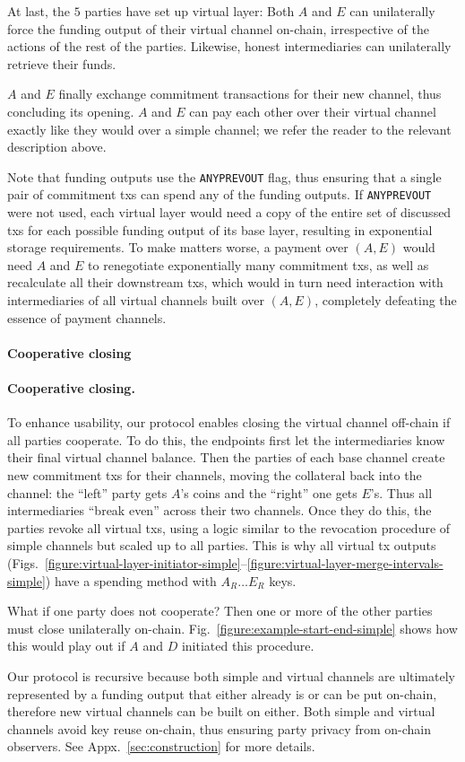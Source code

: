  At last, the $5$ parties have set up virtual layer: Both $A$ and $E$ can
  unilaterally
  force the funding output of their virtual channel on-chain, irrespective of
  the actions of the rest of the parties. Likewise, honest intermediaries can
  unilaterally retrieve their funds.

  $A$ and $E$ finally exchange
  commitment transactions for their new channel, thus concluding its opening.
  $A$ and $E$ can pay each other over their virtual channel exactly like
  they would over a simple channel; we refer the reader to the relevant
  description above.

  Note that funding outputs use the \texttt{ANYPREVOUT} flag, thus ensuring
  that a single pair of commitment txs can spend any of the funding outputs. If
  \texttt{ANYPREVOUT} were not used, each virtual layer would need a copy of the
  entire set of discussed txs for each possible funding output of its base
  layer, resulting in exponential storage requirements. To make matters worse,
  a payment over $(A, E)$ would need $A$ and $E$ to renegotiate exponentially
  many commitment txs, as well as recalculate all their downstream txs, which
  would in turn need interaction with intermediaries of all virtual channels
  built over $(A, E)$, completely defeating the essence of payment channels.

  \makeatletter%
    {\paragraph{Cooperative closing}}%
    {\paragraph{Cooperative closing.}}%
  \makeatother%
  To enhance usability, our protocol enables closing the virtual channel
  off-chain if all parties cooperate. To do this, the endpoints first
  let the intermediaries know their final virtual channel balance. Then the
  parties of each base channel create new commitment txs for their channels,
  moving the collateral back into the channel: the ``left'' party gets $A$'s
  coins and the ``right'' one gets $E$'s. Thus all intermediaries ``break even''
  across their two channels. Once they do this, the parties revoke all virtual
  txs, using a logic similar to the revocation procedure of simple channels but
  scaled up to all parties. This is why all virtual tx outputs
  (Figs.~\ref{figure:virtual-layer-initiator-simple}--\ref{figure:virtual-layer-merge-intervals-simple})
  have a spending method with $A_R \dots E_R$ keys.

  What if one party does not cooperate? Then one or more of the other parties must close
  unilaterally on-chain. Fig.~\ref{figure:example-start-end-simple} shows how
  this would play out if $A$ and $D$ initiated this procedure.

  Our protocol is recursive because both simple and virtual channels are
  ultimately represented by a funding output that either already is or can be put
  on-chain, therefore new virtual channels can be built on either.
  Both simple and virtual channels avoid key reuse on-chain, thus ensuring party
  privacy from on-chain observers. See Appx.~\ref{sec:construction} for more
  details.
